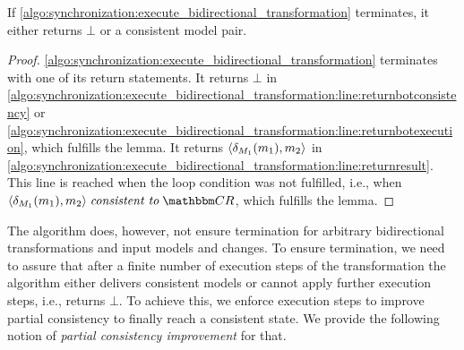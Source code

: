 \begin{lemma}
    \label{lemma:bidirectionaltransformationconsistency}
    If \autoref{algo:synchronization:execute_bidirectional_transformation} terminates, it either returns $\bot$ or a consistent model pair.
\end{lemma}
\begin{proof}
    \autoref{algo:synchronization:execute_bidirectional_transformation} terminates with one of its return statements.
    It returns $\bot$ in \autoref{algo:synchronization:execute_bidirectional_transformation:line:returnbotconsistency} or \autoref{algo:synchronization:execute_bidirectional_transformation:line:returnbotexecution}, which fulfills the lemma.
    It returns $\tupled{\change{\metamodel{M}{1}}(\model{m}{1}), \model{m}{2}}$ in \autoref{algo:synchronization:execute_bidirectional_transformation:line:returnresult}.
    This line is reached when the loop condition was not fulfilled, i.e., when $\tupled{\change{\metamodel{M}{1}}(\model{m}{1}), \model{m}{2}} \consistenttomath \consistencyrelationset{CR}$, which fulfills the lemma.
\end{proof}

The algorithm does, however, not ensure termination for arbitrary bidirectional transformations and input models and changes.
To ensure termination, we need to assure that after a finite number of execution steps of the transformation the algorithm either delivers consistent models or cannot apply further execution steps, i.e., returns $\bot$.
To achieve this, we enforce execution steps to improve partial consistency to finally reach a consistent state. 
We provide the following notion of \emph{partial consistency improvement} for that.

